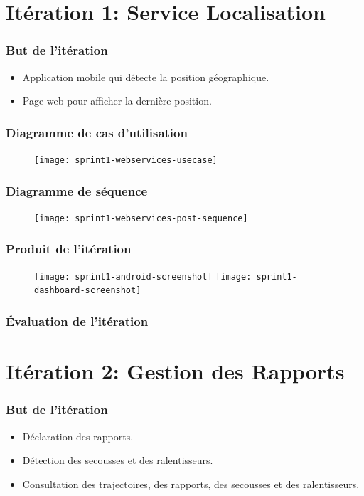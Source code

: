 \documentclass{beamer}
\begin{document}
\section{Itération 1: Service Localisation}

\begin{frame}
    \frametitle{But de l'itération}
    \begin{itemize}
        \item<1-> Application mobile qui détecte la position géographique.
        \item<2-> Page web pour afficher la dernière position.
    \end{itemize}
\end{frame}

\begin{frame}
    \frametitle{Diagramme de cas d'utilisation}
    \begin{figure}
        \texttt{[image: sprint1-webservices-usecase]}
    \end{figure}
\end{frame}

\begin{frame}
    \frametitle{Diagramme de séquence}
    \begin{figure}
        \texttt{[image: sprint1-webservices-post-sequence]}
    \end{figure}
\end{frame}

\begin{frame}
    \frametitle{Produit de l'itération}
    \begin{figure}
        \texttt{[image: sprint1-android-screenshot]}
        \texttt{[image: sprint1-dashboard-screenshot]}
    \end{figure}
\end{frame}

\begin{frame}
\frametitle{Évaluation de l'itération}
\begin{minipage}{\textwidth}

\end{minipage}
\end{frame}

\section{Itération 2: Gestion des Rapports}

\begin{frame}
    \frametitle{But de l'itération}
    \begin{itemize}
        \item<1-> Déclaration des rapports.
        \item<2-> Détection des secousses et des ralentisseurs.
        \item<3-> Consultation des trajectoires, des rapports, des secousses et des ralentisseurs.
    \end{itemize}
\end{frame}
\end{document}
